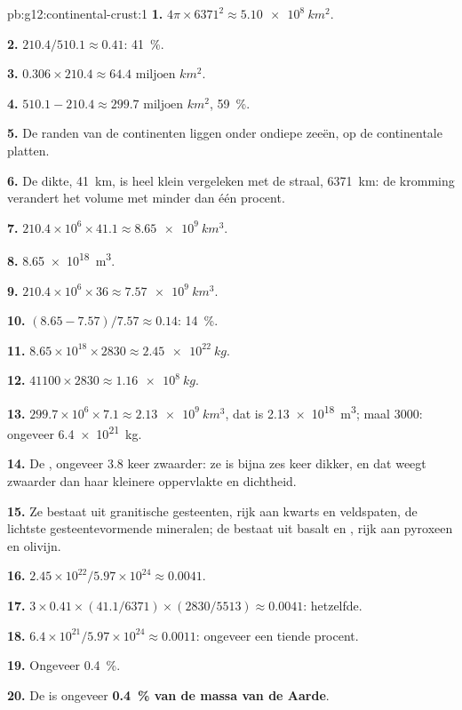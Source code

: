 \begin{solution}{pb:g12:continental-crust:1}
\textbf{1.} $4\pi \times 6371^2 \approx \qty{5.10e8}{km^2}$.

\textbf{2.} $210.4/510.1 \approx 0.41$: \qty{41}{\percent}.

\textbf{3.} $0.306 \times 210.4 \approx \num{64.4}\text{ miljoen }\unit{km^2}$.

\textbf{4.} $510.1 - 210.4 \approx \num{299.7}\text{ miljoen }\unit{km^2}$,
\qty{59}{\percent}.

\textbf{5.} De randen van de continenten liggen onder ondiepe zeeën, op de
continentale platten.

\textbf{6.} De dikte, \qty{41}{km}, is heel klein vergeleken met de
straal, \qty{6371}{km}: de kromming verandert het volume met minder dan één
procent.

\textbf{7.} $210.4 \times 10^6 \times 41.1 \approx \qty{8.65e9}{km^3}$.

\textbf{8.} \qty{8.65e18}{m^3}.

\textbf{9.} $210.4 \times 10^6 \times 36 \approx \qty{7.57e9}{km^3}$.

\textbf{10.} $(8.65 - 7.57)/7.57 \approx 0.14$: \qty{14}{\percent}.

\textbf{11.} $8.65 \times 10^{18} \times 2830 \approx \qty{2.45e22}{kg}$.

\textbf{12.} $41100 \times 2830 \approx \qty{1.16e8}{kg}$.

\textbf{13.} $299.7 \times 10^6 \times 7.1 \approx \qty{2.13e9}{km^3}$, dat
is \qty{2.13e18}{m^3}; maal 3000: ongeveer \qty{6.4e21}{kg}.

\textbf{14.} De , ongeveer 3.8 keer zwaarder: ze is bijna zes
keer dikker, en dat weegt zwaarder dan haar kleinere oppervlakte en dichtheid.

\textbf{15.} Ze bestaat uit granitische gesteenten, rijk aan kwarts en veldspaten, de
lichtste gesteentevormende mineralen; de  bestaat uit basalt en
, rijk aan pyroxeen en olivijn.

\textbf{16.} $2.45 \times 10^{22}/5.97 \times 10^{24} \approx 0.0041$.

\textbf{17.} $3 \times 0.41 \times (41.1/6371) \times (2830/5513) \approx
0.0041$: hetzelfde.

\textbf{18.} $6.4 \times 10^{21}/5.97 \times 10^{24} \approx 0.0011$: ongeveer een
tiende procent.

\textbf{19.} Ongeveer \qty{0.4}{\percent}.

\textbf{20.} De  is ongeveer \textbf{\qty{0.4}{\percent} van de
massa van de Aarde}.
\end{solution}
